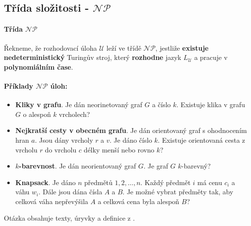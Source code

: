 \subsection{Třída složitosti - $\mathcal{NP}$}
\label{heading:np}

\paragraph{Třída $\mathcal{NP}$} Řekneme, že rozhodovací úloha $\mathcal{U}$ leží ve třídě $\mathcal{NP}$, jestliže \textbf{existuje nedeterministický} Turingův stroj, který \textbf{rozhodne} jazyk $L_\mathcal{U}$ a pracuje v \textbf{polynomiálním čase}.

\paragraph{Příklady $\mathcal{NP}$ úloh:}
\begin{itemize}[itemsep=0pt]
    \item \textbf{\color{darkBrown}Kliky v grafu}. Je dán neorinetovaný graf $G$ a číslo $k$. Existuje klika v grafu $G$ o alespoň $k$ vrcholech?
    
    \item \textbf{\color{darkBrown}Nejkratší cesty v obecném grafu}. Je dán orientovaný graf s ohodnocením hran $a$. Jsou dány vrcholy $r$ a $v$. Je dáno číslo $k$. Existuje orientovaná cesta z vrcholu $r$ do vrcholu $c$ délky menší nebo rovno $k$?
    
    \item \textbf{\color{darkBrown}$k$-barevnost}. Je dán neorientovaný graf $G$. Je graf $G$ $k$-barevný?    
    \item \textbf{\color{darkBrown}Knapsack}. Je dáno $n$ předmětů $1,2, \dots, n$. Každý předmět $i$ má cenu $c_i$ a váhu $w_i$. Dále jsou dána čísla $A$ a $B$. Je možné vybrat předměty tak, aby celková váha nepřevýšila $A$ a celková cena byla alespoň $B$?
\end{itemize}

Otázka obsahuje texty, úryvky a definice z \cite{tal:demlova}.
